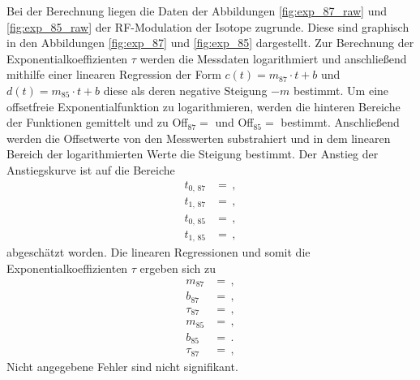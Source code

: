 Bei der Berechnung liegen die Daten der Abbildungen \ref{fig:exp_87_raw} und \ref{fig:exp_85_raw} der RF-Modulation der Isotope zugrunde.
Diese sind graphisch in den Abbildungen \ref{fig:exp_87} und \ref{fig:exp_85} dargestellt.
Zur Berechnung der Exponentialkoeffizienten $\tau$ werden die Messdaten logarithmiert und anschließend mithilfe einer linearen Regression der Form $c(t)=m_\text{87} \cdot t + b$ und $d(t)=m_\text{85} \cdot t + b$ diese als deren negative Steigung $-m$ bestimmt.
Um eine offsetfreie Exponentialfunktion zu logarithmieren, werden die hinteren Bereiche der Funktionen gemittelt und zu Off$_\text{87} = $ und Off$_\text{85} = $ bestimmt.
Anschließend werden die Offsetwerte von den Messwerten substrahiert und in dem linearen Bereich der logarithmierten Werte die Steigung bestimmt.
Der Anstieg der Anstiegskurve ist auf die Bereiche
\begin{align*}
    t_\text{0, 87} &=  \,,\\
    t_\text{1, 87} &=  \,,\\
    t_\text{0, 85} &=  \,,\\
    t_\text{1, 85} &=  \,,
\end{align*}
abgeschätzt worden.
Die linearen Regressionen und somit die Exponentialkoeffizienten $\tau$ ergeben sich zu
\begin{align*}
    m_\text{87} &=  \,,\\
    b_\text{87} &=  \,,\\
    \tau_\text{87} &=  \,,\\
    m_\text{85} &=  \,,\\
    b_\text{85} &=  \,.\\
    \tau_\text{87} &=  \,,
\end{align*}
Nicht angegebene Fehler sind nicht signifikant.

